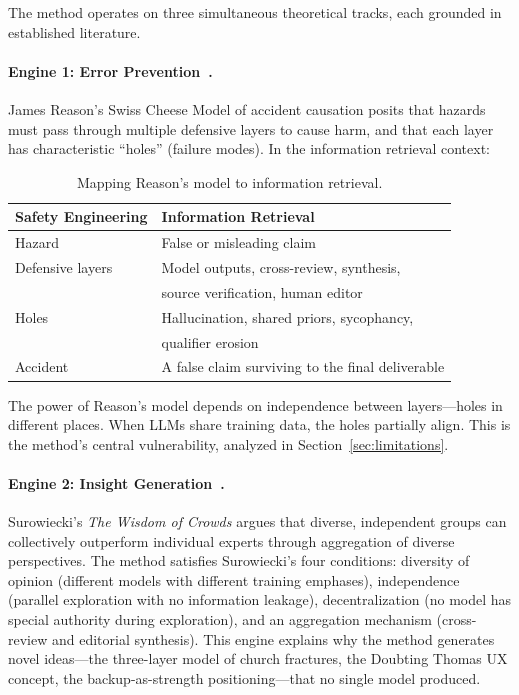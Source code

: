 \documentclass[11pt,letterpaper]{article}
\begin{document}
The method operates on three simultaneous theoretical tracks, each grounded in established literature.

\paragraph{Engine 1: Error Prevention~\cite{reason1990}.} James Reason's Swiss Cheese Model of accident causation posits that hazards must pass through multiple defensive layers to cause harm, and that each layer has characteristic ``holes'' (failure modes). In the information retrieval context:

\begin{table}[ht]
\centering
\caption{Mapping Reason's model to information retrieval.}
\label{tab:reason-mapping}
\begin{tabular}{@{}ll@{}}
\toprule
\textbf{Safety Engineering} & \textbf{Information Retrieval} \\
\midrule
Hazard & False or misleading claim \\
Defensive layers & Model outputs, cross-review, synthesis, \\
 & source verification, human editor \\
Holes & Hallucination, shared priors, sycophancy, \\
 & qualifier erosion \\
Accident & A false claim surviving to the final deliverable \\
\bottomrule
\end{tabular}
\end{table}

The power of Reason's model depends on independence between layers---holes in different places. When LLMs share training data, the holes partially align. This is the method's central vulnerability, analyzed in Section~\ref{sec:limitations}.

\paragraph{Engine 2: Insight Generation~\cite{surowiecki2004}.} Surowiecki's \emph{The Wisdom of Crowds} argues that diverse, independent groups can collectively outperform individual experts through aggregation of diverse perspectives. The method satisfies Surowiecki's four conditions: diversity of opinion (different models with different training emphases), independence (parallel exploration with no information leakage), decentralization (no model has special authority during exploration), and an aggregation mechanism (cross-review and editorial synthesis). This engine explains why the method generates novel ideas---the three-layer model of church fractures, the Doubting Thomas UX concept, the backup-as-strength positioning---that no single model produced.
\end{document}
